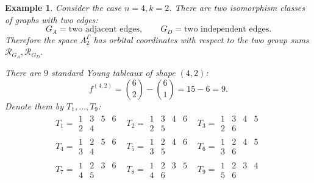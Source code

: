 \documentclass[12pt,reqno]{amsart}
\newtheorem{example}{Example}[section]
\begin{document}
\begin{example}{\rm
Consider the case \(n=4,k=2\). There are two isomorphism classes of graphs
with two edges:
$$
G_A=\text{two adjacent edges},\qquad
G_D=\text{two independent edges}.
$$
Therefore the space \(A_2^\Gamma\) has orbital coordinates with respect to
the two group sums
$
\mathcal R_{G_A}, \mathcal R_{G_D}.
$

There are \(9\) standard Young tableaux of shape \((4,2)\):
$$
f^{(4,2)}=\binom62-\binom61=15-6=9.
$$
Denote them by \(T_1,\dots,T_9\):
$$
\begin{array}{ccc}
T_1=
\begin{array}{cccc}
1&3&5&6\\
2&4
\end{array}
&
T_2=
\begin{array}{cccc}
1&3&4&6\\
2&5
\end{array}
&
T_3=
\begin{array}{cccc}
1&3&4&5\\
2&6
\end{array}
\\[12pt]
T_4=
\begin{array}{cccc}
1&2&5&6\\
3&4
\end{array}
&
T_5=
\begin{array}{cccc}
1&2&4&6\\
3&5
\end{array}
&
T_6=
\begin{array}{cccc}
1&2&4&5\\
3&6
\end{array}
\\[12pt]
T_7=
\begin{array}{cccc}
1&2&3&6\\
4&5
\end{array}
&
T_8=
\begin{array}{cccc}
1&2&3&5\\
4&6
\end{array}
&
T_9=
\begin{array}{cccc}
1&2&3&4\\
5&6
\end{array}
\end{array}
$$

}
\end{example}
\end{document}
